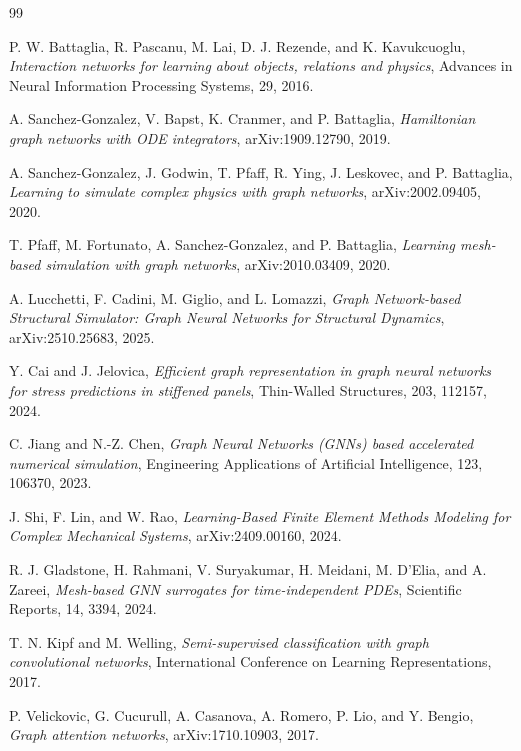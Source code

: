 \documentclass[11pt,a4paper,reqno]{amsart}
\theoremstyle{definition}
\theoremstyle{remark}
\numberwithin{equation}{section}
\begin{document}

\begin{thebibliography}{99}

P. W. Battaglia, R. Pascanu, M. Lai, D. J. Rezende, and K. Kavukcuoglu,
\textit{Interaction networks for learning about objects, relations and physics},
Advances in Neural Information Processing Systems, 29, 2016.

A. Sanchez-Gonzalez, V. Bapst, K. Cranmer, and P. Battaglia,
\textit{Hamiltonian graph networks with ODE integrators},
arXiv:1909.12790, 2019.

A. Sanchez-Gonzalez, J. Godwin, T. Pfaff, R. Ying, J. Leskovec, and P. Battaglia,
\textit{Learning to simulate complex physics with graph networks},
arXiv:2002.09405, 2020.

T. Pfaff, M. Fortunato, A. Sanchez-Gonzalez, and P. Battaglia,
\textit{Learning mesh-based simulation with graph networks},
arXiv:2010.03409, 2020.

A. Lucchetti, F. Cadini, M. Giglio, and L. Lomazzi,
\textit{Graph Network-based Structural Simulator: Graph Neural Networks for Structural Dynamics},
arXiv:2510.25683, 2025.

Y. Cai and J. Jelovica,
\textit{Efficient graph representation in graph neural networks for stress predictions in stiffened panels},
Thin-Walled Structures, 203, 112157, 2024.

C. Jiang and N.-Z. Chen,
\textit{Graph Neural Networks (GNNs) based accelerated numerical simulation},
Engineering Applications of Artificial Intelligence, 123, 106370, 2023.

J. Shi, F. Lin, and W. Rao,
\textit{Learning-Based Finite Element Methods Modeling for Complex Mechanical Systems},
arXiv:2409.00160, 2024.

R. J. Gladstone, H. Rahmani, V. Suryakumar, H. Meidani, M. D'Elia, and A. Zareei,
\textit{Mesh-based GNN surrogates for time-independent PDEs},
Scientific Reports, 14, 3394, 2024.

T. N. Kipf and M. Welling,
\textit{Semi-supervised classification with graph convolutional networks},
International Conference on Learning Representations, 2017.

P. Velickovic, G. Cucurull, A. Casanova, A. Romero, P. Lio, and Y. Bengio,
\textit{Graph attention networks},
arXiv:1710.10903, 2017.


\end{thebibliography}
\end{document}
